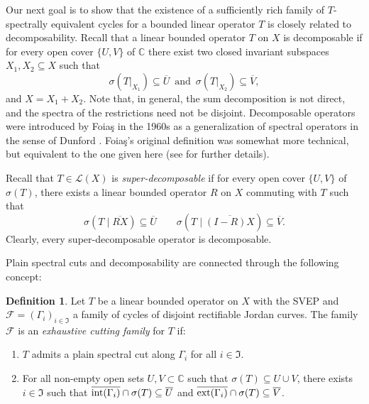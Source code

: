 \documentclass[11pt]{amsart}
\theoremstyle{definition}
\newtheorem{definition}[theorem]{Definition}
\theoremstyle{remark}
\numberwithin{equation}{section}
\newcommand{\EL}{\mathcal{L}}
\newcommand{\C}{\mathbb{C}}
\newcommand{\inte}{\textnormal{int}}
\newcommand{\exte}{\textnormal{ext}}
\begin{document}
\smallskip

Our next goal is to show that the existence of a sufficiently rich family of $T$-spectrally equivalent cycles  for a bounded linear operator $T$ is closely related to decomposability.
Recall that a linear bounded  operator $T$ on $X$ is decomposable if for every open cover $\{U,V\}$ of $\mathbb{C}$ there exist two closed invariant subspaces $X_1,X_2 \subseteq
X$ such that
$$
	\sigma(T\vert_{X_1}) \subseteq   \overline{U} \, \text{ and } \, \sigma(T\vert_{X_2}) \subseteq   \overline{V},
$$
and $X= X_1+X_2$. Note that, in general, the sum decomposition is not direct, and the spectra of the restrictions need not be disjoint. Decomposable operators were introduced by Foia\c{s} \cite{FOIAS} in the 1960s as a generalization of spectral operators in the sense of Dunford \cite{Dunford and Schwarz}. Foia\c{s}'s original definition was somewhat more technical, but equivalent to the one given here (see \cite{LN00} for further details).

\smallskip

Recall that $T\in \EL(X)$ is \textit{super-decomposable} if for every open cover $\{U,V\}$ of $\sigma(T)$, there exists a linear bounded operator $R$ on $X$ commuting with $T$ such that
$$\sigma(T\mid{\overline{RX}})\subseteq  \overline{U}\qquad \sigma(T\mid{\overline{(I-R)X}})\subseteq  \overline{V}. $$
Clearly, every super-decomposable operator is decomposable.

\medskip

Plain spectral cuts and decomposability are connected through the following concept:

\begin{definition}\label{definition exhaustive}
     Let $T$ be a linear bounded operator on $X$ with the SVEP and  $\mathcal{F}= (\Gamma_i)_{i\in\mathfrak{I}}$ a family of cycles of disjoint rectifiable Jordan curves. The family $\mathcal{F}$ is an \textit{exhaustive cutting family} for $T$ if:
     \begin{enumerate}
          \item [(i)]$T$ admits a plain spectral cut along $\Gamma_i$ for all $i\in \mathfrak{I}$.
        \item [(ii)] For all non-empty open sets $U,V\subset\C$ such that $\sigma(T)\subseteq   U\cup V$, there exists $i\in \mathfrak{I}$ such that $\overline{\inte(\Gamma_i)}\cap \sigma(T) \subseteq  \overline{U}$ and $\overline{\exte(\Gamma_i)}\cap \sigma(T) \subseteq  \overline{V}$.
     \end{enumerate}
\end{definition}
\end{document}
